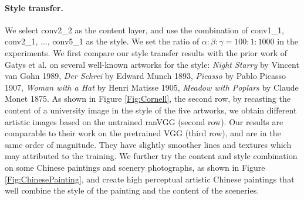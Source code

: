 \documentclass{article}
\begin{document}
\paragraph{Style transfer.}
We select conv2\_2 as the content layer, and use the combination of conv1\_1,  conv2\_1, ..., conv5\_1 as the style.
We set the ratio of $\alpha :\beta : \gamma = 100 : 1 : 1000$ in the experiments.
We first compare our style transfer results with the prior work of Gatys et al.\cite{Gatys2015Style} on several well-known artworks for the style:
\emph{Night Starry} by Vincent van Gohn 1989, \emph{Der Schrei} by Edward Munch 1893,
\emph{Picasso} by Pablo Picasso 1907, \emph{Woman with a Hat} by Henri Matisse 1905, \emph{Meadow with Poplars} by Claude Monet 1875.
As shown in Figure \ref{Fig:Cornell}, the second row, by recasting the content of a university image in the style of the five artworks,
we obtain different artistic images based on the untrained ranVGG (second row).
Our results are comparable to their work \cite{Gatys2015Style} on the pretrained VGG (third row), and are in the same order of magnitude. They have slightly smoother lines and textures which may attributed to the training.
We further try the content and style combination on some Chinese paintings and scenery photographs, as shown in Figure \ref{Fig:ChinesePainting},
and create high perceptual artistic Chinese paintings that well combine the style of the painting and the content of the sceneries.
\end{document}
